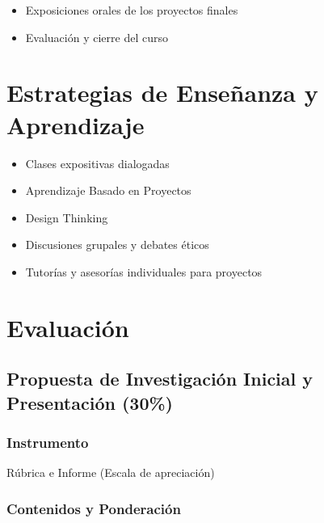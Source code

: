 \documentclass[11pt,letter,]{article}
\providecommand{\tightlist}{%
  \setlength{\itemsep}{0pt}\setlength{\parskip}{0pt}}
\begin{document}
\begin{itemize}
\tightlist
\item
  Exposiciones orales de los proyectos finales
\item
  Evaluación y cierre del curso
\end{itemize}

\hypertarget{estrategias-de-enseuxf1anza-y-aprendizaje}{%
\section{Estrategias de Enseñanza y
Aprendizaje}\label{estrategias-de-enseuxf1anza-y-aprendizaje}}

\begin{itemize}
\tightlist
\item
  Clases expositivas dialogadas
\item
  Aprendizaje Basado en Proyectos
\item
  Design Thinking
\item
  Discusiones grupales y debates éticos
\item
  Tutorías y asesorías individuales para proyectos
\end{itemize}

\hypertarget{evaluaciuxf3n}{%
\section{Evaluación}\label{evaluaciuxf3n}}

\hypertarget{propuesta-de-investigaciuxf3n-inicial-y-presentaciuxf3n-30}{%
\subsection{Propuesta de Investigación Inicial y Presentación
(30\%)}\label{propuesta-de-investigaciuxf3n-inicial-y-presentaciuxf3n-30}}

\hypertarget{instrumento}{%
\subsubsection{Instrumento}\label{instrumento}}

Rúbrica e Informe (Escala de apreciación)

\hypertarget{contenidos-y-ponderaciuxf3n}{%
\subsubsection{Contenidos y
Ponderación}\label{contenidos-y-ponderaciuxf3n}}
\end{document}
